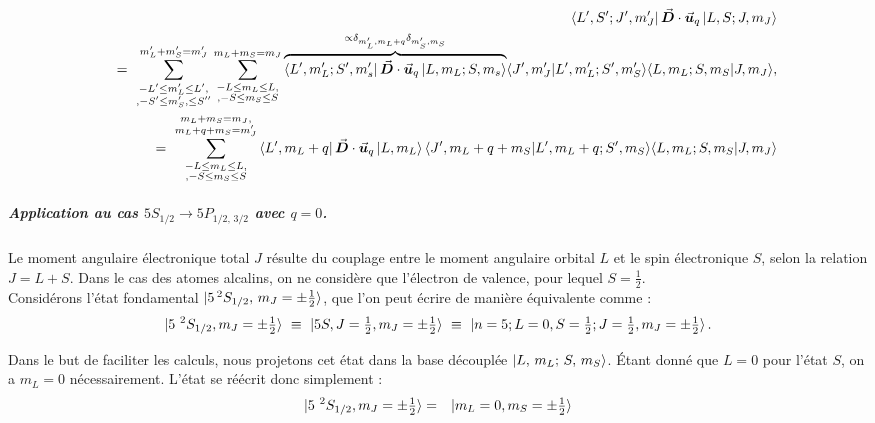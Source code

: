 \begin{eqnarray}
	&&\bra{L' , S' ; J' , m_J' }  \vec{{\bm{D}}} \cdot \vec{{\bm{u}}}_q 	\ket{L , S ; J , m_J }  \\
	&&~ = ~ \sum_{\substack{-L' \leq m_L' \leq L',\\, -S' \leq m_S', \leq S''}}^{m_L' + m_S'= m_J'}\sum_{\substack{-L \leq m_L \leq L,\\, -S \leq m_S \leq S }}^{m_L + m_S = m_J} \overbrace{\bra{L',m_L';S',m_s'} \vec{{\bm{D}}} \cdot \vec{{\bm{u}}}_q \ket{L,m_L;S,m_s}}^{\propto \delta_{m_L',m_L+q}\delta_{m_S',m_S}} \langle J' , m_J' \vert L' , m_L' ; S' , m_S' \rangle \langle L , m_L ; S , m_S \vert J , m_J \rangle ,\\
	&&~ = ~  \sum_{\substack{-L \leq m_L \leq L,\\, -S \leq m_S \leq S}}^{\substack{ m_L + m_S = m_J, \\ m_L + q + m_S = m_J'}} \bra{L', m_L+q} \vec{{\bm{D}}} \cdot \vec{{\bm{u}}}_q \ket{L,m_L}\langle J' , m_L + q + m_S \vert L' ,  m_L + q  ; S' ,  m_S \rangle \langle L , m_L ; S , m_S \vert J , m_J \rangle
\end{eqnarray}


\subparagraph{Application au cas $5S_{1/2} \rightarrow 5P_{1/2,\,3/2}$ avec $q = 0$.}


Le moment angulaire électronique total $J$ résulte du couplage entre le moment angulaire orbital $L$ et le spin électronique $S$, selon la relation $J = L + S$. Dans le cas des atomes alcalins, on ne considère que l’électron de valence, pour lequel $S = \tfrac12$.\\

Considérons l’état fondamental $\ket{5\,^2S_{1/2},\,m_J = \pm \tfrac12}$, que l’on peut écrire de manière équivalente comme :
\begin{eqnarray*}
	\ket{ 5{~}^2S_{1/2} , m_J = \pm \tfrac12  } ~\equiv~ \ket{ 5S , J=\tfrac12  , m_J= \pm \tfrac12  }  ~\equiv~ \ket{n=5 ; L=0 , S=\tfrac12 ;  J=\tfrac12  , m_J = \pm \tfrac12 }.
\end{eqnarray*}

Dans le but de faciliter les calculs, nous projetons cet état dans la base découplée $\ket{L,\,m_L;\,S,\,m_S}$. Étant donné que $L = 0$ pour l’état $S$, on a $m_L = 0$ nécessairement. L’état se réécrit donc simplement :
\begin{eqnarray*}
	\ket{ 5{~}^2S_{1/2} , m_J = \pm \tfrac12  } & = & \ket{  m_L = 0  , m_S= \pm \tfrac12  }  	
\end{eqnarray*}


